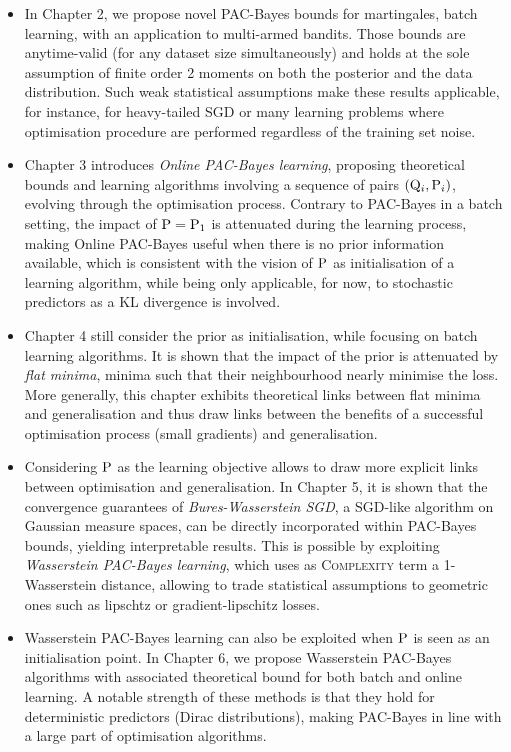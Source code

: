 \begin{itemize}
  \item In Chapter 2, we propose novel PAC-Bayes bounds for martingales, batch learning, with an application to multi-armed bandits. Those bounds are anytime-valid (\ie for any dataset size simultaneously) and holds at the sole assumption of finite order 2 moments on both the posterior and the data distribution. Such weak statistical assumptions make these results applicable, for instance, for heavy-tailed SGD or many learning problems where optimisation procedure are performed regardless of the training set noise.
  \item Chapter 3 introduces \emph{Online PAC-Bayes learning}, proposing theoretical bounds and learning algorithms involving a sequence of pairs $(\Q_i,\P_i)$, evolving through the optimisation process. Contrary to PAC-Bayes in a batch setting, the impact of $\P=\P_1$ is attenuated during the learning process, making Online PAC-Bayes useful when there is no prior information available, which is consistent with the vision of $\P$ as initialisation of a learning algorithm, while being only applicable, for now, to stochastic predictors as a KL divergence is involved.
  \item Chapter 4 still consider the prior as initialisation, while focusing on batch learning algorithms. It is shown that the impact of the prior is attenuated by \emph{flat minima}, \ie minima such that their neighbourhood nearly minimise the loss. More generally, this chapter exhibits theoretical links between flat minima and generalisation and thus draw links between the benefits of a successful optimisation process (small gradients) and generalisation.
  \item Considering $\P$ as the learning objective allows to draw more explicit links between optimisation and generalisation. In Chapter 5, it is shown that the convergence guarantees of \emph{Bures-Wasserstein SGD}, a SGD-like algorithm on Gaussian measure spaces, can be directly incorporated within PAC-Bayes bounds, yielding interpretable results. This is possible by exploiting \emph{Wasserstein PAC-Bayes learning}, which uses as \textsc{Complexity} term a 1-Wasserstein distance, allowing to trade statistical assumptions to geometric ones such as lipschtz or gradient-lipschitz losses. 
  \item Wasserstein PAC-Bayes learning can also be exploited when $\P$ is seen as an initialisation point. In Chapter 6, we propose Wasserstein PAC-Bayes algorithms with associated theoretical bound for both batch and online learning. A notable strength of these methods is that they hold for deterministic predictors (Dirac distributions), making PAC-Bayes in line with a large part of optimisation algorithms.
\end{itemize}

